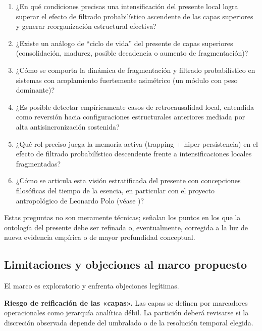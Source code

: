 \begin{enumerate}
    \item ¿En qué condiciones precisas una intensificación del presente local logra superar el efecto de filtrado probabilístico ascendente de las capas superiores y generar reorganización estructural efectiva?
    
    \item ¿Existe un análogo de ``ciclo de vida'' del presente de capas superiores (consolidación, madurez, posible decadencia o aumento de fragmentación)?
    
    \item ¿Cómo se comporta la dinámica de fragmentación y filtrado probabilístico en sistemas con acoplamiento fuertemente asimétrico (un módulo con peso dominante)?
    
    \item ¿Es posible detectar empíricamente casos de retrocausalidad local, entendida como reversión hacia configuraciones estructurales anteriores mediada por alta antisincronización sostenida?
    
    \item ¿Qué rol preciso juega la memoria activa (trapping + hiper-persistencia) en el efecto de filtrado probabilístico descendente frente a intensificaciones locales fragmentadas?
    
    \item ¿Cómo se articula esta visión estratificada del presente con concepciones filosóficas del tiempo de la esencia, en particular con el proyecto antropológico de Leonardo Polo (véase \citep{polo_antropologia_trascendental,padilla_polo_dialogue_2026})?
\end{enumerate}

Estas preguntas no son meramente técnicas; señalan los puntos en los que la ontología del presente debe ser refinada o, eventualmente, corregida a la luz de nueva evidencia empírica o de mayor profundidad conceptual.

\subsection{Limitaciones y objeciones al marco propuesto}

El marco es exploratorio y enfrenta objeciones legítimas.

\textbf{Riesgo de reificación de las «capas».} Las capas se definen por marcadores operacionales como jerarquía analítica débil. La partición deberá revisarse si la discreción observada depende del umbralado o de la resolución temporal elegida.

